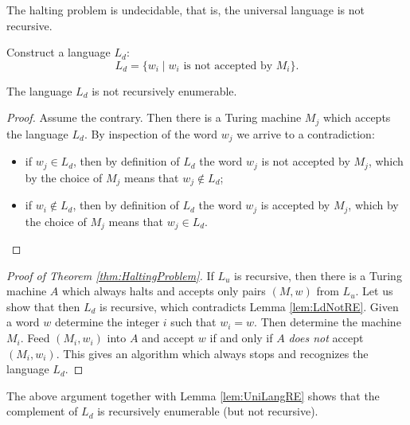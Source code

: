 \begin{page}

\begin{thm}
\label{thm:HaltingProblem}
The halting problem is undecidable, that is, the universal language is not recursive.
\end{thm}

\end{page}

\begin{page}


Construct a language $L_d$:
\[
L_d = \{w_i \mid w_i \text{ is not accepted by }M_i\}.
\]


\end{page}

\begin{page}

\begin{lem}
\label{lem:LdNotRE}
The language $L_d$ is not recursively enumerable.
\end{lem}

\end{page}

\begin{page}

\begin{proof}
Assume the contrary.
Then there is a Turing machine $M_j$ which accepts the language $L_d$.
By inspection of the word $w_j$ we arrive to a contradiction:
\begin{itemize}
\item
if $w_j \in L_d$, then by definition of $L_d$ the word $w_j$ is not accepted by $M_j$, which by the choice of $M_j$ means that $w_j \notin L_d$;
\item
if $w_i \notin L_d$, then by definition of $L_d$ the word $w_j$ is accepted by $M_j$, which by the choice of $M_j$ means that $w_j \in L_d$.
\end{itemize}
\end{proof}


\begin{proof}[Proof of Theorem \ref{thm:HaltingProblem}]
If $L_u$ is recursive, then there is a Turing machine $A$ which always halts and accepts only pairs $(M, w)$ from $L_u$.
Let us show that then $L_d$ is recursive, which contradicts Lemma \ref{lem:LdNotRE}.
Given a word $w$ determine the integer $i$ such that $w_i = w$.
Then determine the machine $M_i$.
Feed $(M_i, w_i)$ into $A$ and accept $w$ if and only if $A$ \emph{does not} accept $(M_i,w_i)$.
This gives an algorithm which always stops and recognizes the language $L_d$.
\end{proof}


\end{page}

\begin{page}

\begin{rem}
The above argument together with Lemma \ref{lem:UniLangRE} shows that
the complement of $L_d$ is recursively enumerable (but not recursive).
\end{rem}

\end{page}

